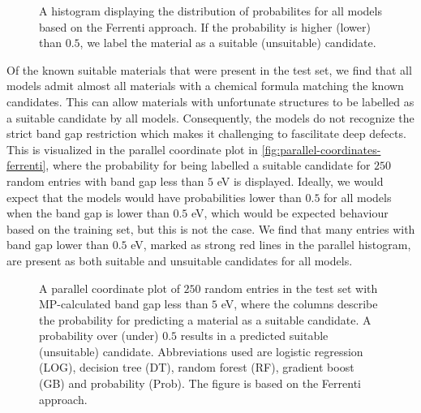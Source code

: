 \begin{figure}[ht!]
    \centering
    
    \vspace*{-130mm}
    \caption{A histogram displaying the distribution of probabilites for all models based on the Ferrenti approach. If the probability is higher (lower) than $0.5$, we label the material as a suitable (unsuitable) candidate.}
    \label{fig:histogram-ferrenti}
\end{figure}

\noindent Of the known suitable materials that were present in the test set, we find that all models admit almost all materials with a chemical formula matching the known candidates.
This can allow materials with unfortunate structures to be labelled as a suitable candidate by all models. Consequently, the models do not recognize the strict band gap restriction which makes it challenging to fascilitate deep defects. This is visualized in the parallel coordinate plot in \autoref{fig:parallel-coordinates-ferrenti}, where the probability for being labelled a suitable candidate for $250$ random entries with band gap less than $5$ eV is displayed.
Ideally, we would expect that the models would have probabilities lower than $0.5$ for all models when the band gap is lower than $0.5$ eV, which would be expected behaviour based on the training set, but this is not the case. We find that many entries with band gap lower than $0.5$ eV, marked as strong red lines in the parallel histogram, are present as both suitable and unsuitable candidates for all models. %


\begin{figure}[ht!]
    \centering
    
    \vspace*{-130mm}
    \caption{A parallel coordinate plot of $250$ random entries in the test set with MP-calculated band gap less than $5$ eV, where the columns describe the probability for predicting a material as a suitable candidate. A probability over (under) $0.5$ results in a predicted suitable (unsuitable) candidate. Abbreviations used are logistic regression (LOG), decision tree (DT), random forest (RF), gradient boost (GB) and probability (Prob). The figure is based on the Ferrenti approach.}
    \label{fig:parallel-coordinates-ferrenti}
\end{figure}

